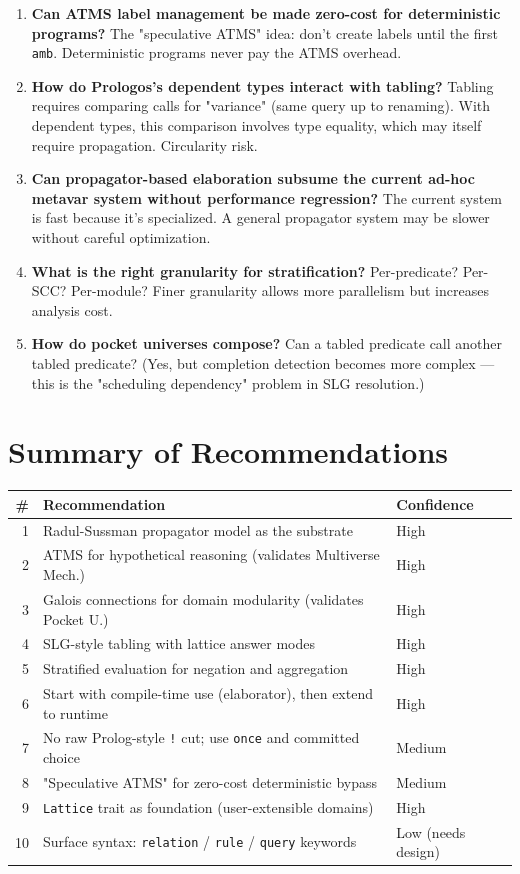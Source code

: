 \documentclass[11pt]{article}
\begin{document}
\begin{enumerate}
\item \textbf{Can ATMS label management be made zero-cost for deterministic programs?}
The "speculative ATMS" idea: don't create labels until the first \texttt{amb}.
Deterministic programs never pay the ATMS overhead.

\item \textbf{How do Prologos's dependent types interact with tabling?}
Tabling requires comparing calls for "variance" (same query up to
renaming). With dependent types, this comparison involves type equality,
which may itself require propagation. Circularity risk.

\item \textbf{Can propagator-based elaboration subsume the current ad-hoc metavar
system without performance regression?} The current system is fast
because it's specialized. A general propagator system may be slower
without careful optimization.

\item \textbf{What is the right granularity for stratification?}
Per-predicate? Per-SCC? Per-module? Finer granularity allows more
parallelism but increases analysis cost.

\item \textbf{How do pocket universes compose?} Can a tabled predicate call another
tabled predicate? (Yes, but completion detection becomes more complex ---
this is the "scheduling dependency" problem in SLG resolution.)
\end{enumerate}
\section{Summary of Recommendations}
\label{sec:org23d9433}

\begin{center}
\begin{tabular}{rll}
\# & Recommendation & Confidence\\
\hline
1 & Radul-Sussman propagator model as the substrate & High\\
2 & ATMS for hypothetical reasoning (validates Multiverse Mech.) & High\\
3 & Galois connections for domain modularity (validates Pocket U.) & High\\
4 & SLG-style tabling with lattice answer modes & High\\
5 & Stratified evaluation for negation and aggregation & High\\
6 & Start with compile-time use (elaborator), then extend to runtime & High\\
7 & No raw Prolog-style \texttt{!} cut; use \texttt{once} and committed choice & Medium\\
8 & "Speculative ATMS" for zero-cost deterministic bypass & Medium\\
9 & \texttt{Lattice} trait as foundation (user-extensible domains) & High\\
10 & Surface syntax: \texttt{relation} / \texttt{rule} / \texttt{query} keywords & Low (needs design)\\
\end{tabular}
\end{center}
\end{document}
